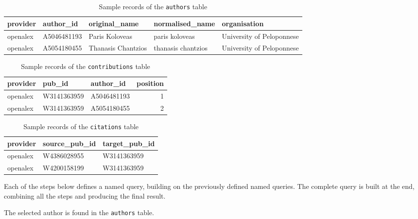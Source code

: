 \begin{table}[tb]
    \centering
    \footnotesize
    \begin{tabular}{|l|l|l|l|l|}
        \hline
        provider & author\_id & original\_name & normalised\_name & organisation \\
        \hline\hline
        openalex & A5046481193 & Paris Koloveas & paris koloveas & University of Peloponnese \\
        openalex & A5054180455 & Thanasis Chantzios & thanasis chantzios & University of Peloponnese \\
        \hline
    \end{tabular}
    \caption{Sample records of the \texttt{authors} table}
    \label{tab:sample-authors}
\end{table}

\begin{table}[tb]
    \centering
    \begin{tabular}{|l|l|l|r|}
        \hline
        provider & pub\_id & author\_id & position \\
        \hline\hline
        openalex & W3141363959 & A5046481193 & 1 \\
        openalex & W3141363959 & A5054180455 & 2 \\
        \hline
    \end{tabular}
    \caption{Sample records of the \texttt{contributions} table}
    \label{tab:sample-contributions}
\end{table}

\begin{table}[tb]
    \centering
    \begin{tabular}{|l|l|l|}
        \hline
        provider & source\_pub\_id & target\_pub\_id \\
        \hline\hline
        openalex & W4386028955 & W3141363959 \\
        openalex & W4200158199 & W3141363959 \\
        \hline
    \end{tabular}
    \caption{Sample records of the \texttt{citations} table}
    \label{tab:sample-citations}
\end{table}

Each of the steps below defines a named query, building on the previously defined named queries.
The complete query is built at the end, combining all the steps and producing the final result.

The selected author is found in the \texttt{authors} table.


